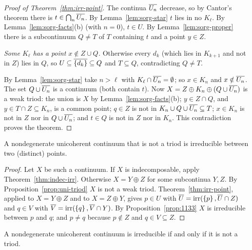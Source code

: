 \begin{proof}[Proof of Theorem~\ref{thm:irr-point}]
The continua $\overline{U_n}$ decrease, so by Cantor's theorem there is $t\in\bigcap_n\overline{U_n}$. By
Lemma~\ref{lem:sorg-star} $t$ lies in no $K_\ell$. By Lemma~\ref{lem:sorg-facts}(b) (with $n=0$),
$t\in U$. By Lemma~\ref{lem:sorg-proper} there is a subcontinuum $Q\ne T$ of $T$ containing $t$ and a
point $y\in Z$.

\emph{Some $K_\ell$ has a point $x\notin Z\cup Q$.} Otherwise every $d_k$ (which lies in $K_{k+1}$ and
not in $Z$) lies in $Q$, so $U\subseteq\overline{\left\{ d_k \right\}}\subseteq Q$ and $T\subseteq Q$, contradicting $Q\neq T$.

By Lemma~\ref{lem:sorg-star} take $n>\ell$ with $K_\ell\cap\overline{U_n}=\emptyset$; so $x\in K_n$ and
$x\notin\overline{U_n}$. The set $Q\cup\overline{U_n}$ is a continuum (both contain $t$). Now
$X=Z\oplus K_n\oplus(Q\cup\overline{U_n})$ is a weak triod: the union is $X$ by
Lemma~\ref{lem:sorg-facts}(b); $y\in Z\cap Q$, and $y\in T\cap Z\subseteq K_n$, is a common point; $q\in Z$
is not in $K_n\cup Q\cup\overline{U_n}\subseteq T$; $x\in K_n$ is not in $Z$ nor in $Q\cup\overline{U_n}$; and $t\in Q$
is not in $Z$ nor in $K_n$. This contradiction proves the theorem.
\end{proof}


\begin{theorem}[Sorgenfrey]\label{thm:sorgenfrey}
A nondegenerate unicoherent continuum that is not a triod is irreducible between two (distinct)
points.
\end{theorem}

\begin{proof}
Let $X$ be such a continuum. If $X$ is indecomposable, apply Theorem~\ref{thm:indec-irr}. Otherwise
$X=Y\oplus Z$ for some subcontinua $Y,Z$. By Proposition~\ref{prop:uni-triod} $X$ is not a weak triod.
Theorem~\ref{thm:irr-point}, applied to $X=Y\oplus Z$ and to $X=Z\oplus Y$, gives $p\in U$ with $\overline{U}=\operatorname{irr}(\left\{ p \right\},\overline{U}\cap Z)$ and $q\in V$ with $\overline{V}=\operatorname{irr}(\left\{ q \right\},\overline{V}\cap Y)$. By
Proposition~\ref{prop:1133} $X$ is irreducible between $p$ and $q$; and $p\ne q$ because $p\notin Z$
and $q\in V\subseteq Z$.
\end{proof}


\begin{corollary}\label{cor:irr-iff}
A nondegenerate unicoherent continuum is irreducible if and only if it is not a triod.
\end{corollary}

